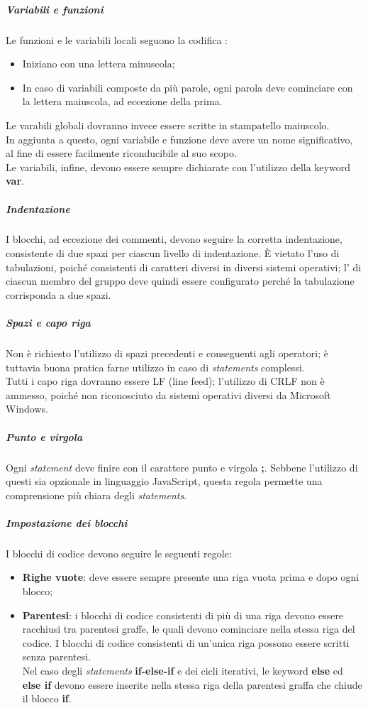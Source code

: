 \documentclass[../norme-di-progetto.tex]{subfiles}
\begin{document}
\subparagraph*{Variabili e funzioni}
Le funzioni e le variabili locali seguono la codifica :
\begin{itemize}
  \item Iniziano con una lettera minuscola;
  \item In caso di variabili composte da più parole, ogni parola deve cominciare con la lettera maiuscola, ad eccezione della prima.
\end{itemize}
Le varabili globali dovranno invece essere scritte in stampatello maiuscolo. \\
In aggiunta a questo, ogni variabile e funzione deve avere un nome significativo, al fine di essere facilmente riconducibile al suo scopo. \\
Le variabili, infine, devono essere sempre dichiarate con l'utilizzo della keyword \textbf{var}.

\subparagraph*{Indentazione}
I blocchi, ad eccezione dei commenti, devono seguire la corretta indentazione, consistente di due spazi per ciascun livello di indentazione. È vietato l'uso di tabulazioni, poiché consistenti di caratteri diversi in diversi sistemi operativi; l' di ciascun membro del gruppo deve quindi essere configurato perché la tabulazione corrisponda a due spazi.

\subparagraph*{Spazi e capo riga}
Non è richiesto l'utilizzo di spazi precedenti e conseguenti agli operatori; è tuttavia buona pratica farne utilizzo in caso di \textit{statements} complessi. \\
Tutti i capo riga dovranno essere LF (line feed); l'utilizzo di CRLF non è ammesso, poiché non riconosciuto da sistemi operativi diversi da Microsoft Windows.

\subparagraph*{Punto e virgola}
Ogni \textit{statement} deve finire con il carattere punto e virgola \textbf{;}. Sebbene l'utilizzo di questi sia opzionale in linguaggio JavaScript, questa regola permette una comprensione più chiara degli \textit{statements}.

\subparagraph*{Impostazione dei blocchi}
I blocchi di codice devono seguire le seguenti regole:
\begin{itemize}
  \item \textbf{Righe vuote}: deve essere sempre presente una riga vuota prima e dopo ogni blocco;
  \item \textbf{Parentesi}: i blocchi di codice consistenti di più di una riga devono essere racchiusi tra parentesi graffe, le quali devono cominciare nella stessa riga del codice. I blocchi di codice consistenti di un'unica riga possono essere scritti senza parentesi. \\ Nel caso degli \textit{statements} \textbf{if-else-if} e dei cicli iterativi, le keyword \textbf{else} ed \textbf{else if} devono essere inserite nella stessa riga della parentesi graffa che chiude il blocco \textbf{if}.
\end{itemize}

\newpage
\end{document}
